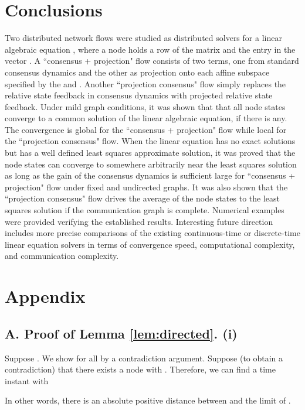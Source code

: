 \documentclass[a4paper, 11pt]{article}
\begin{document}
\section{Conclusions}\label{Sec:conclusions}

Two distributed network flows were studied  as distributed solvers for a linear algebraic equation , where a  node  holds a row  of the matrix  and the entry  in the vector . A ``consensus + projection" flow consists of two terms, one from standard consensus dynamics and the other as projection onto each affine subspace specified by the  and .  Another  ``projection consensus" flow  simply replaces the relative state feedback in consensus dynamics with projected relative state feedback. Under mild graph conditions, it was shown that  that all node states converge to a common solution of the linear algebraic equation, if there is any. The convergence is global for the ``consensus + projection" flow while local for the ``projection consensus" flow.  When the linear equation has no exact solutions but has a well defined least squares approximate solution, it was proved  that the node states can converge to somewhere  arbitrarily near the least squares solution as long as the gain of the consensus dynamics is sufficient large for ``consensus + projection" flow under fixed and undirected graphs.  It was also shown that the ``projection consensus" flow drives the average of the node states to the least squares solution if the communication graph is complete. Numerical examples were provided verifying  the established results.  Interesting future direction includes more precise   comparisons of the existing continuous-time or discrete-time linear equation solvers in terms of convergence speed, computational complexity, and communication complexity.




\section*{Appendix}

\subsection*{A. Proof of Lemma \ref{lem:directed}. (i)}
Suppose . We show    for all  by a contradiction argument. Suppose (to obtain a contradiction) that there exists a node    with . Therefore, we can find a time instant  with

In other words, there is an absolute positive distance between  and the limit  of .
\end{document}
